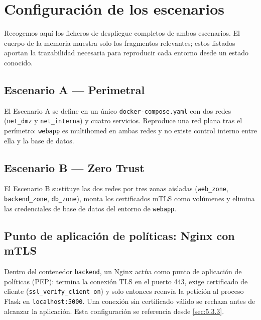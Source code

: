 \documentclass[11pt,spanish,listoffigures,listoftables]{tfgetsinf}
\begin{document}
\chapter{Configuración de los escenarios}
\label{anexo:configuracion}

Recogemos aquí los ficheros de despliegue completos de ambos escenarios. El cuerpo de la memoria muestra solo los fragmentos relevantes; estos listados aportan la trazabilidad necesaria para reproducir cada entorno desde un estado conocido.

\section{Escenario A — Perimetral}

El Escenario A se define en un único \texttt{docker-compose.yaml} con dos redes (\texttt{net\_dmz} y \texttt{net\_interna}) y cuatro servicios. Reproduce una red plana tras el perímetro: \texttt{webapp} es multihomed en ambas redes y no existe control interno entre ella y la base de datos.



\section{Escenario B — Zero Trust}

El Escenario B sustituye las dos redes por tres zonas aisladas (\texttt{web\_zone}, \texttt{backend\_zone}, \texttt{db\_zone}), monta los certificados mTLS como volúmenes y elimina las credenciales de base de datos del entorno de \texttt{webapp}.



\section{Punto de aplicación de políticas: Nginx con mTLS}

Dentro del contenedor \texttt{backend}, un Nginx actúa como punto de aplicación de políticas (PEP): termina la conexión TLS en el puerto 443, exige certificado de cliente (\texttt{ssl\_verify\_client on}) y solo entonces reenvía la petición al proceso Flask en \texttt{localhost:5000}. Una conexión sin certificado válido se rechaza antes de alcanzar la aplicación. Esta configuración se referencia desde \cref{sec:5.3.3}.
\end{document}
